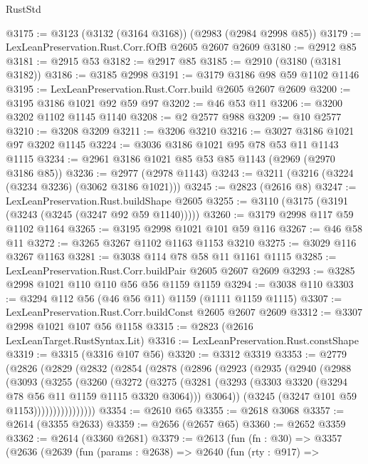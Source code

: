 \begin{lexlean}{RustStd}
\begin{coremodule}
@3175 := @3123 (@3132 (@3164 @3168)) (@2983 (@2984 @2998 @85))
@3179 := LexLeanPreservation.Rust.Corr.fOfB @2605 @2607 @2609
@3180 := @2912 @85
@3181 := @2915 @53
@3182 := @2917 @85
@3185 := @2910 (@3180 (@3181 @3182))
@3186 := @3185 @2998
@3191 := @3179 @3186 @98 @59 @1102 @1146
@3195 := LexLeanPreservation.Rust.Corr.build @2605 @2607 @2609
@3200 := @3195 @3186 @1021 @92 @59 @97
@3202 := @46 @53 @11
@3206 := @3200 @3202 @1102 @1145 @1140
@3208 := @2 @2577 @988
@3209 := @10 @2577
@3210 := @3208 @3209
@3211 := @3206 @3210
@3216 := @3027 @3186 @1021 @97 @3202 @1145
@3224 := @3036 @3186 @1021 @95 @78 @53 @11 @1143 @1115
@3234 := @2961 @3186 @1021 @85 @53 @85 @1143 (@2969 (@2970 @3186 @85))
@3236 := @2977 (@2978 @1143)
@3243 := @3211 (@3216 (@3224 (@3234 @3236) (@3062 @3186 @1021)))
@3245 := @2823 (@2616 @8)
@3247 := LexLeanPreservation.Rust.buildShape @2605
@3255 := @3110 (@3175 (@3191 (@3243 (@3245 (@3247 @92 @59 @1140)))))
@3260 := @3179 @2998 @117 @59 @1102 @1164
@3265 := @3195 @2998 @1021 @101 @59 @116
@3267 := @46 @58 @11
@3272 := @3265 @3267 @1102 @1163 @1153 @3210
@3275 := @3029 @116 @3267 @1163
@3281 := @3038 @114 @78 @58 @11 @1161 @1115
@3285 := LexLeanPreservation.Rust.Corr.buildPair @2605 @2607 @2609
@3293 := @3285 @2998 @1021 @110 @110 @56 @56 @1159 @1159
@3294 := @3038 @110
@3303 := @3294 @112 @56 (@46 @56 @11) @1159 (@1111 @1159 @1115)
@3307 := LexLeanPreservation.Rust.Corr.buildConst @2605 @2607 @2609
@3312 := @3307 @2998 @1021 @107 @56 @1158
@3315 := @2823 (@2616 LexLeanTarget.RustSyntax.Lit)
@3316 := LexLeanPreservation.Rust.constShape
@3319 := @3315 (@3316 @107 @56)
@3320 := @3312 @3319
@3353 := @2779
    (@2826
      (@2829
        (@2832
          (@2854
            (@2878
              (@2896
                (@2923
                  (@2935
                    (@2940
                      (@2988
                        (@3093
                          (@3255
                            (@3260
                              (@3272
                                (@3275
                                  (@3281
                                    (@3293
                                      (@3303 @3320 (@3294 @78 @56 @11 @1159 @1115 @3320 @3064)))
                                    @3064))
                                (@3245 (@3247 @101 @59 @1153))))))))))))))))
@3354 := @2610 @65
@3355 := @2618 @3068
@3357 := @2614 (@3355 @2633)
@3359 := @2656 (@2657 @65)
@3360 := @2652 @3359
@3362 := @2614 (@3360 @2681)
@3379 := @2613
    (fun (fn : @30) =>
    @3357
      (@2636
        (@2639
          (fun (params : @2638) =>
          @2640
            (fun (rty : @917) =>

\end{coremodule}
\end{lexlean}
